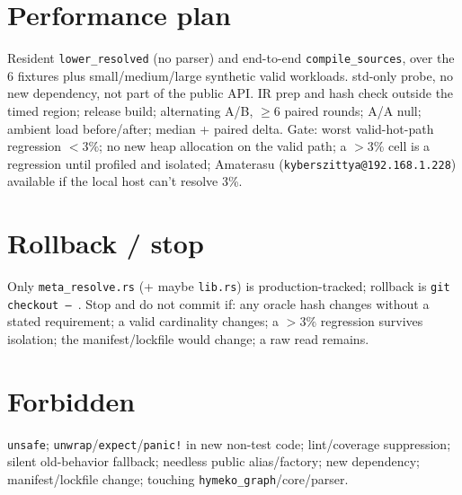\documentclass[11pt]{article}
\begin{document}
\section{Performance plan}
Resident \texttt{lower\_resolved} (no parser) and end-to-end
\texttt{compile\_sources}, over the 6 fixtures plus small/medium/large synthetic
valid workloads. std-only probe, no new dependency, not part of the public API.
IR prep and hash check outside the timed region; release build; alternating A/B,
$\ge$6 paired rounds; A/A null; ambient load before/after; median + paired delta.
Gate: worst valid-hot-path regression $<3\%$; no new heap allocation on the valid
path; a $>3\%$ cell is a regression until profiled and isolated; Amaterasu
(\texttt{kyberszittya@192.168.1.228}) available if the local host can't resolve 3\%.

\section{Rollback / stop}
Only \texttt{meta\_resolve.rs} (+ maybe \texttt{lib.rs}) is production-tracked;
rollback is \texttt{git checkout -- }. Stop and do not commit if: any oracle hash
changes without a stated requirement; a valid cardinality changes; a $>3\%$
regression survives isolation; the manifest/lockfile would change; a raw read
remains.

\section{Forbidden}
\texttt{unsafe}; \texttt{unwrap}/\texttt{expect}/\texttt{panic!} in new non-test code;
lint/coverage suppression; silent old-behavior fallback; needless public
alias/factory; new dependency; manifest/lockfile change; touching
\texttt{hymeko\_graph}/core/parser.
\end{document}
